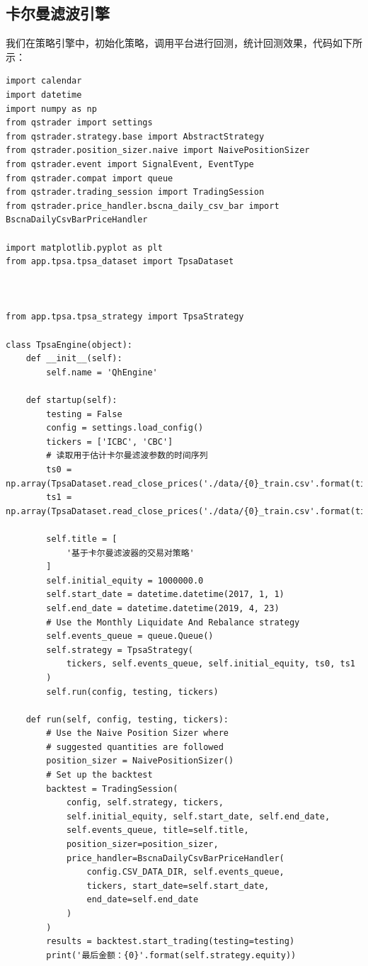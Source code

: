 \documentclass{article}
\begin{document}
\subsection{卡尔曼滤波引擎}
我们在策略引擎中，初始化策略，调用平台进行回测，统计回测效果，代码如下所示：
\begin{lstlisting}
import calendar
import datetime
import numpy as np
from qstrader import settings
from qstrader.strategy.base import AbstractStrategy
from qstrader.position_sizer.naive import NaivePositionSizer
from qstrader.event import SignalEvent, EventType
from qstrader.compat import queue
from qstrader.trading_session import TradingSession
from qstrader.price_handler.bscna_daily_csv_bar import BscnaDailyCsvBarPriceHandler

import matplotlib.pyplot as plt
from app.tpsa.tpsa_dataset import TpsaDataset



from app.tpsa.tpsa_strategy import TpsaStrategy

class TpsaEngine(object):
    def __init__(self):
        self.name = 'QhEngine'
        
    def startup(self):
        testing = False
        config = settings.load_config()
        tickers = ['ICBC', 'CBC']
        # 读取用于估计卡尔曼滤波参数的时间序列
        ts0 = np.array(TpsaDataset.read_close_prices('./data/{0}_train.csv'.format(tickers[0])))
        ts1 = np.array(TpsaDataset.read_close_prices('./data/{0}_train.csv'.format(tickers[1])))
        
        self.title = [
            '基于卡尔曼滤波器的交易对策略'
        ]
        self.initial_equity = 1000000.0
        self.start_date = datetime.datetime(2017, 1, 1)
        self.end_date = datetime.datetime(2019, 4, 23)
        # Use the Monthly Liquidate And Rebalance strategy
        self.events_queue = queue.Queue()
        self.strategy = TpsaStrategy(
            tickers, self.events_queue, self.initial_equity, ts0, ts1
        )
        self.run(config, testing, tickers) 

    def run(self, config, testing, tickers):
        # Use the Naive Position Sizer where
        # suggested quantities are followed
        position_sizer = NaivePositionSizer()
        # Set up the backtest
        backtest = TradingSession(
            config, self.strategy, tickers,
            self.initial_equity, self.start_date, self.end_date,
            self.events_queue, title=self.title,
            position_sizer=position_sizer,
            price_handler=BscnaDailyCsvBarPriceHandler(
                config.CSV_DATA_DIR, self.events_queue,
                tickers, start_date=self.start_date,
                end_date=self.end_date
            )
        )
        results = backtest.start_trading(testing=testing)
        print('最后金额：{0}'.format(self.strategy.equity))
        

\end{lstlisting}
\end{document}

